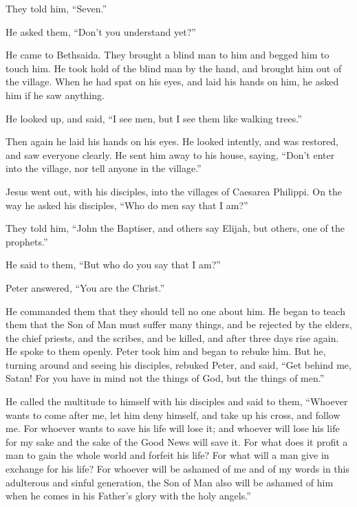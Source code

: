 They told him, ``Seven.''

 He asked them, ``Don't you understand yet?''

 He came to Bethsaida. They brought a blind man to him
and begged him to touch him.  He took hold of the blind
man by the hand, and brought him out of the village. When he had spat on
his eyes, and laid his hands on him, he asked him if he saw anything.

 He looked up, and said, ``I see men, but I see them like
walking trees.''

 Then again he laid his hands on his eyes. He looked
intently, and was restored, and saw everyone clearly.  He
sent him away to his house, saying, ``Don't enter into the village, nor
tell anyone in the village.''

 Jesus went out, with his disciples, into the villages of
Caesarea Philippi. On the way he asked his disciples, ``Who do men say
that I am?''

 They told him, ``John the Baptiser, and others say
Elijah, but others, one of the prophets.''

 He said to them, ``But who do you say that I am?''

Peter answered, ``You are the Christ.''

 He commanded them that they should tell no one about
him.  He began to teach them that the Son of Man must
suffer many things, and be rejected by the elders, the chief priests,
and the scribes, and be killed, and after three days rise again.
 He spoke to them openly. Peter took him and began to
rebuke him.  But he, turning around and seeing his
disciples, rebuked Peter, and said, ``Get behind me, Satan! For you have
in mind not the things of God, but the things of men.''

 He called the multitude to himself with his disciples
and said to them, ``Whoever wants to come after me, let him deny
himself, and take up his cross, and follow me.  For
whoever wants to save his life will lose it; and whoever will lose his
life for my sake and the sake of the Good News will save it.
 For what does it profit a man to gain the whole world
and forfeit his life?  For what will a man give in
exchange for his life?  For whoever will be ashamed of me
and of my words in this adulterous and sinful generation, the Son of Man
also will be ashamed of him when he comes in his Father's glory with the
holy angels.''

